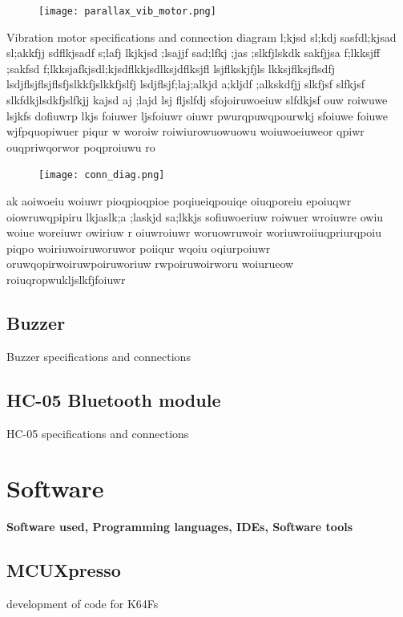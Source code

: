 \documentclass[12pt,a4paper]{article}
\begin{document}
		\begin{figure}
			\centering
			\texttt{[image: parallax\_vib\_motor.png]}
		\end{figure}
		
		Vibration motor specifications and connection diagram
		l;kjsd sl;kdj sasfdl;kjsad sl;akkfjj sdflkjsadf s;lafj lkjkjsd ;lsajjf sad;lfkj
		;jas ;slkfjlskdk sakfjjsa f;lkksjff ;sakfsd f;lkksjafkjsdl;kjsdflkkjsdlksjdflksjfl
		lsjflkskjfjls lkksjflksjflsdfj
		lsdjflsjflsjflsfjslkkfjslkkfjslfj
		lsdjflsjf;laj;alkjd a;kljdf ;alkskdfjj slkfjsf slfkjsf slkfdkjlsdkfjslfkjj kajsd aj 
		;lajd lsj fljslfdj sfojoiruwoeiuw slfdkjsf ouw roiwuwe lsjkfs dofiuwrp lkjs foiuwer 
		ljsfoiuwr oiuwr pwurqpuwqpourwkj sfoiuwe  foiuwe wjfpquopiwuer 
		piqur w woroiw roiwiurowuowuowu woiuwoeiuweor qpiwr ouqpriwqorwor poqproiuwu ro
		
		\begin{figure}
			\centering
			\texttt{[image: conn\_diag.png]}
		\end{figure}
		 ak aoiwoeiu woiuwr pioqpioqpioe poqiueiqpouiqe oiuqporeiu epoiuqwr oiowruwqpipiru
		 lkjaslk;a ;laskjd sa;lkkjs sofiuwoeriuw roiwuer wroiuwre owiu woiue woreiuwr owiriuw r
		 oiuwroiuwr woruowruwoir woriuwroiiuqpriurqpoiu piqpo woiriuwoiruworuwor poiiqur wqoiu
		 oqiurpoiuwr oruwqopirwoiruwpoiruworiuw rwpoiruwoirworu woiurueow roiuqropwukljslkfjfoiuwr\\ 
		 
		
		\subsection{Buzzer}
		Buzzer specifications and connections
		
		\subsection{HC-05 Bluetooth module}
		HC-05 specifications and connections
		\newpage
	
	
	
	\section{Software}
	{\bfseries Software used, Programming languages, IDEs, Software tools}\\
	
		\subsection{MCUXpresso}
		development of code for K64Fs
		\newpage
	
\end{document}
